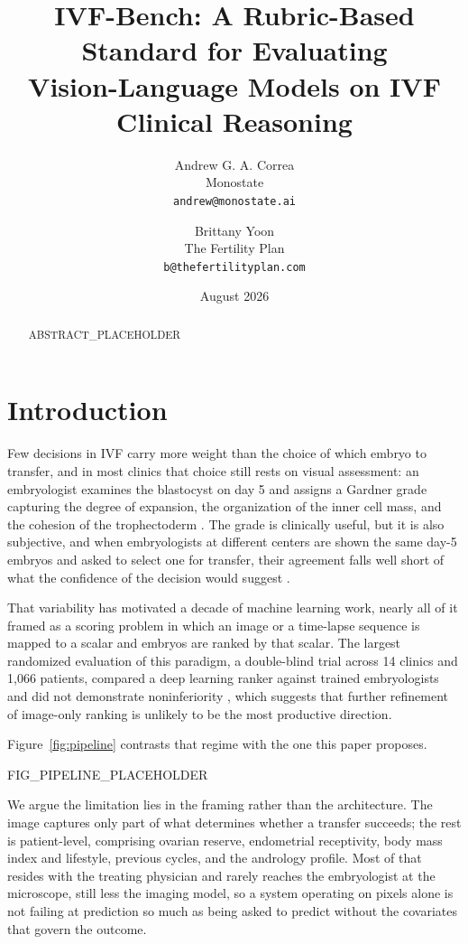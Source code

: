 \documentclass[11pt]{article}
\title{\textbf{IVF-Bench: A Rubric-Based Standard for Evaluating\\Vision-Language Models on IVF Clinical Reasoning}}
\author{
  Andrew G. A. Correa\\Monostate\\\texttt{andrew@monostate.ai}
  \and
  Brittany Yoon\\The Fertility Plan\\\texttt{b@thefertilityplan.com}
}
\date{August 2026}
\begin{document}
\maketitle

\begin{abstract}
ABSTRACT_PLACEHOLDER
\end{abstract}

\section{Introduction}

Few decisions in IVF carry more weight than the choice of which embryo to
transfer, and in most clinics that choice still rests on visual assessment: an
embryologist examines the blastocyst on day 5 and assigns a Gardner grade
capturing the degree of expansion, the organization of the inner cell mass, and
the cohesion of the trophectoderm \citep{gardner1999}. The grade is clinically
useful, but it is also subjective, and when embryologists at different centers
are shown the same day-5 embryos and asked to select one for transfer, their
agreement falls well short of what the confidence of the decision would
suggest \citep{storr2017}.

That variability has motivated a decade of machine learning work, nearly all of
it framed as a scoring problem in which an image or a time-lapse sequence is
mapped to a scalar and embryos are ranked by that scalar. The largest randomized
evaluation of this paradigm, a double-blind trial across 14 clinics and 1,066
patients, compared a deep learning ranker against trained embryologists and did
not demonstrate noninferiority \citep{illingworth2024}, which suggests that
further refinement of image-only ranking is unlikely to be the most productive
direction.

Figure~\ref{fig:pipeline} contrasts that regime with the one this paper
proposes.

FIG_PIPELINE_PLACEHOLDER

We argue the limitation lies in the framing rather than the architecture. The
image captures only part of what determines whether a transfer succeeds; the rest
is patient-level, comprising ovarian reserve, endometrial receptivity, body mass
index and lifestyle, previous cycles, and the andrology profile. Most of that
resides with the treating physician and rarely reaches the embryologist at the
microscope, still less the imaging model, so a system operating on pixels alone
is not failing at prediction so much as being asked to predict without the
covariates that govern the outcome.
\end{document}
